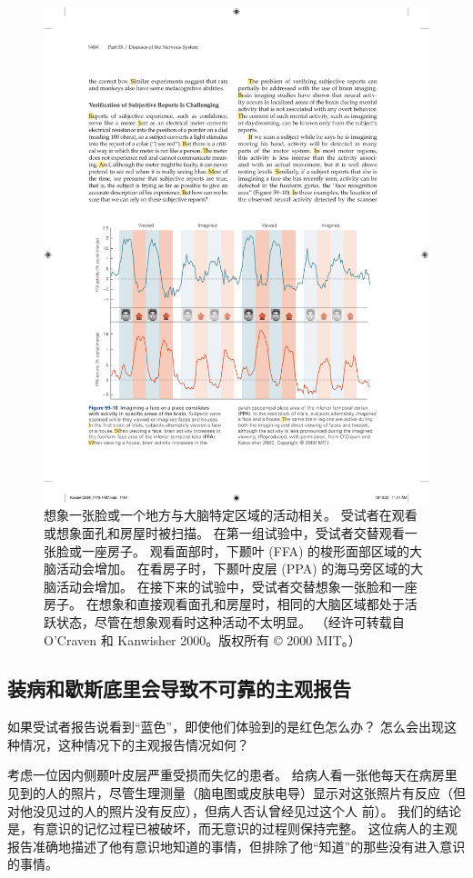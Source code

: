 \begin{figure}[htbp]
	\centering
	\includegraphics[width=0.9\linewidth]{chap59/fig_59_10}
	\caption{想象一张脸或一个地方与大脑特定区域的活动相关。 受试者在观看或想象面孔和房屋时被扫描。 在第一组试验中，受试者交替观看一张脸或一座房子。 观看面部时，下颞叶 (FFA) 的梭形面部区域的大脑活动会增加。 在看房子时，下颞叶皮层 (PPA) 的海马旁区域的大脑活动会增加。 在接下来的试验中，受试者交替想象一张脸和一座房子。 在想象和直接观看面孔和房屋时，相同的大脑区域都处于活跃状态，尽管在想象观看时这种活动不太明显。 （经许可转载自 O'Craven 和 Kanwisher 2000。版权所有 © 2000 MIT。）}
	\label{fig:59_10}
\end{figure}

\subsection{装病和歇斯底里会导致不可靠的主观报告}
如果受试者报告说看到“蓝色”，即使他们体验到的是红色怎么办？ 怎么会出现这种情况，这种情况下的主观报告情况如何？

考虑一位因内侧颞叶皮层严重受损而失忆的患者。 给病人看一张他每天在病房里见到的人的照片，尽管生理测量（脑电图或皮肤电导）显示对这张照片有反应（但对他没见过的人的照片没有反应），但病人否认曾经见过这个人 前）。 我们的结论是，有意识的记忆过程已被破坏，而无意识的过程则保持完整。 这位病人的主观报告准确地描述了他有意识地知道的事情，但排除了他“知道”的那些没有进入意识的事情。


